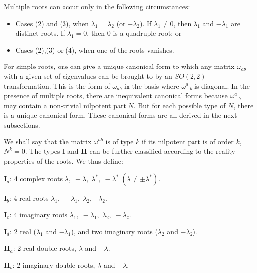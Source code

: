 \documentclass[12pt]{article}
\newcounter{c1} \newcounter{c2}
\begin{document}
Multiple roots can occur only in the following circumstances:

\begin{itemize}
\item Cases (2) and (3), when $\lambda_1= \lambda_2$ (or $-\lambda_2$). If
$\lambda_1 \neq 0$, then $\lambda_1$ and $-\lambda_1$ are
distinct roots. If $\lambda_1=0$, then 0 is a quadruple root; or

\item Cases (2),(3) or (4), when one of the roots vanishes.
\end{itemize}
\vspace{1cm}





For simple roots, one can give a unique canonical form to which
any matrix $\omega_{ab}$ with a given set of eigenvalues can
be brought to by an $SO(2,2)$ transformation. This is the form
of $\omega_{ab}$ in the basis where $\omega^a\,_b$ is
diagonal.  In the presence of multiple roots, there are
inequivalent canonical forms because $\omega^a\,_b$ may contain a
non-trivial nilpotent part $N$. But for each possible type of
$N$, there is a unique canonical form.  These canonical forms
are all derived in the next subsections.

We shall say that the matrix $\omega^{ab}$ is of type $k$ if its
nilpotent part is of order $k$, $N^k =0$. The types {\bf I} and
{\bf II} can be further classified according to the reality
properties of the roots. We thus define:
\\

{\bf I$_a$}: 4  complex roots $\lambda,\; -\lambda,\;
\lambda^*,\; -\lambda^*\; (\lambda \neq \pm \lambda^*)$.

{\bf I$_b$}: 4 real roots $\lambda_1,\; -\lambda_1,\;
\lambda_2, -\lambda_2$.

{\bf I$_c$}: 4 imaginary roots $\lambda_1,\; -\lambda_1,\;
\lambda_2,\; -\lambda_2$.

{\bf I$_d$}: 2 real ($\lambda_1$ and $-\lambda_1$), and two
imaginary roots ($\lambda_2$ and $-\lambda_2$).


{\bf II$_a$}: 2 real double roots, $\lambda$ and
$-\lambda$.

{\bf II$_b$}: 2 imaginary double roots, $\lambda$ and
$-\lambda$.
\end{document}
